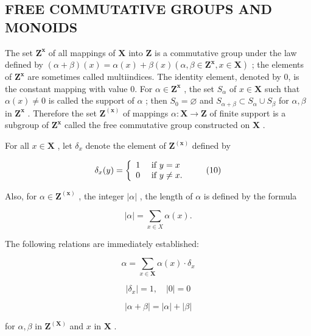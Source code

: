 \subsection{FREE COMMUTATIVE GROUPS AND MONOIDS}

The set \(\mathbf{Z}^{\mathbf{x}}\) of all mappings of \(\mathbf{X}\) into \(\mathbf{Z}\) is a commutative group under the law defined by \((\alpha + \beta)(x) = \alpha(x) + \beta(x)(\alpha, \beta \in \mathbf{Z}^{\mathbf{x}}, x \in \mathbf{X})\) ; the elements of \(\mathbf{Z}^{\mathbf{x}}\) are sometimes called multiindices. The identity element, denoted by 0, is the constant mapping with value 0. For \(\alpha \in \mathbf{Z}^{\mathbf{x}}\) , the set \(S_{\alpha}\) of \(x \in \mathbf{X}\) such that \(\alpha(x) \neq 0\) is called the support of \(\alpha\) ; then \(S_0 = \varnothing\) and \(S_{\alpha + \beta} \subset S_{\alpha} \cup S_{\beta}\) for \(\alpha, \beta\) in \(\mathbf{Z}^{\mathbf{x}}\) . Therefore the set \(\mathbf{Z}^{(\mathbf{x})}\) of mappings \(\alpha: \mathbf{X} \to \mathbf{Z}\) of finite support is a subgroup of \(\mathbf{Z}^{\mathbf{x}}\) called the free commutative group constructed on \(\mathbf{X}\) .

For all \(x \in \mathbf{X}\) , let \(\delta_x\) denote the element of \(\mathbf{Z}^{(\mathbf{x})}\) defined by

\[
\delta_ {x} (y) = \left\{ \begin{array}{l l} 1 & \text { if } y = x \\ 0 & \text { if } y \neq x. \end{array} \right.\tag{10}
\]

Also, for \(\alpha \in \mathbf{Z}^{(\mathbf{x})}\) , the integer \(|\alpha|\) , the length of \(\alpha\) is defined by the formula

\[
| \alpha | = \sum_ {x \in X} \alpha (x).\tag{11}
\]

The following relations are immediately established:

\[
\alpha = \sum_ {x \in \mathbf {X}} \alpha (x) \cdot \delta_ {x}\tag{12}
\]

\[
\left| \delta_ {x} \right| = 1, \quad \left| 0 \right| = 0\tag{13}
\]

\[
| \alpha + \beta | = | \alpha | + | \beta |\tag{14}
\]

for \(\alpha, \beta\) in \(\mathbf{Z}^{(\mathbf{X})}\) and \(x\) in \(\mathbf{X}\) .

